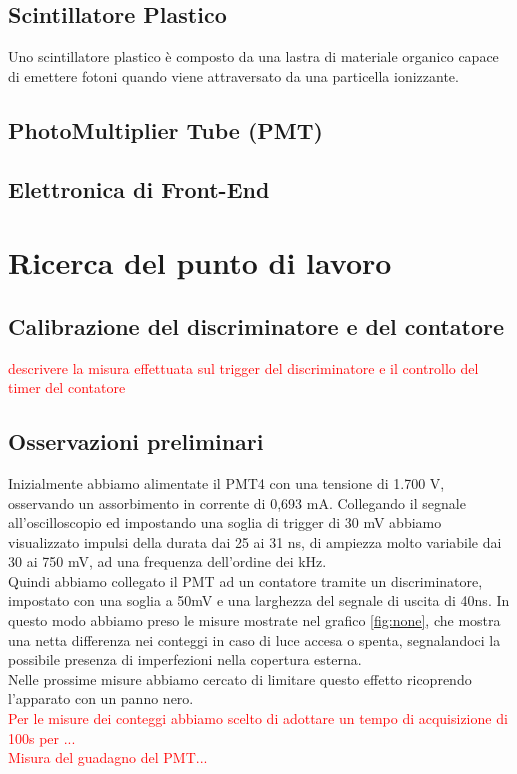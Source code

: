 \documentclass[a4paper,10pt]{article}
\newcommand{\note}[1]{\textcolor{red}{#1}}
\begin{document}
\label{sec:apparato} 
\subsection{Scintillatore Plastico}
Uno scintillatore plastico è composto da una lastra di materiale organico capace di emettere fotoni quando viene attraversato da una particella ionizzante. 

\subsection{PhotoMultiplier Tube (PMT)}

\subsection{Elettronica di Front-End}




\section{Ricerca del punto di lavoro}
\label{sec:puntodilavoro} 
\subsection{Calibrazione del discriminatore e del contatore}
\note{descrivere la misura effettuata sul trigger del discriminatore e il controllo del timer del contatore}

\subsection{Osservazioni preliminari}
Inizialmente abbiamo alimentate il PMT4 con una tensione di 1.700 V, osservando un assorbimento in corrente di 0,693 mA. Collegando il segnale all'oscilloscopio ed impostando una soglia di trigger di 30 mV abbiamo visualizzato impulsi della durata dai 25 ai 31 ns, di ampiezza molto variabile dai 30 ai 750 mV, ad una frequenza dell'ordine dei kHz.
\\
Quindi abbiamo collegato il PMT ad un contatore tramite un discriminatore, impostato con una soglia a 50mV e una larghezza del segnale di uscita di 40ns. In questo modo abbiamo preso le misure mostrate nel grafico \ref{fig:none}, che mostra una netta differenza nei conteggi in caso di luce accesa o spenta, segnalandoci la possibile presenza di imperfezioni nella copertura esterna.
\\
Nelle prossime misure abbiamo cercato di limitare questo effetto ricoprendo l'apparato con un panno nero.
\\
\note{Per le misure dei conteggi abbiamo scelto di adottare un tempo di acquisizione di 100s per ...}
\\
\note{Misura del guadagno del PMT...}
\end{document}
